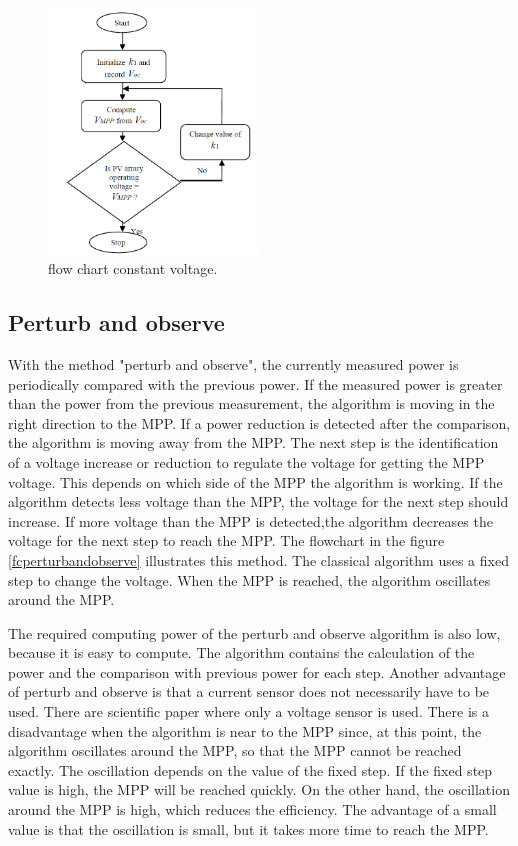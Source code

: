 \begin{figure}[H]
	\begin{center}
		\includegraphics[width=0.5\textwidth]{../Pictures/P1/Flow_chart/Flow_chart_constant_voltage}
		\caption{flow chart constant voltage\cite{flowchartVC}. }
		\label{fcconstantvoltage}
	\end{center}	
\end{figure}

\subsection{Perturb and observe}
With the method "perturb and observe", the currently measured power is periodically compared with the previous power. If the measured power is greater than the power from the previous measurement, the algorithm is moving in the right direction to the MPP. If a power reduction is detected after the comparison, the algorithm is moving away from the MPP. The next step is the identification of a voltage increase or reduction to regulate the voltage for getting the MPP voltage. This depends on which side of the MPP the algorithm is working. If the algorithm detects less voltage than the MPP, the voltage for the next step should increase. If more voltage than the MPP is detected,the algorithm decreases the voltage for the next step to reach the MPP.
The flowchart in the figure \ref{fcperturbandobserve} illustrates this method. The classical algorithm uses a fixed step to change the voltage. When the MPP is reached, the algorithm oscillates around the MPP\cite{flowchartVC}. 

The required computing power of the perturb and observe algorithm is also low, because it is easy to compute. The algorithm contains the calculation of the power and the comparison with previous power for each step. Another advantage of perturb and observe is that a current sensor does not necessarily have to be used. There are scientific paper where only a voltage sensor is used. \cite{withoutcurrent} There is a disadvantage when the algorithm is near to the MPP since, at this point, the algorithm oscillates around the MPP, so that the MPP cannot be reached exactly. The oscillation depends on the value of the fixed step. If the fixed step value is high, the MPP will be reached quickly. On the other hand, the oscillation around the MPP is high, which reduces the efficiency. The advantage of a small value is that the oscillation is small, but it takes more time to reach the MPP\cite{AN1521_MC}. 

